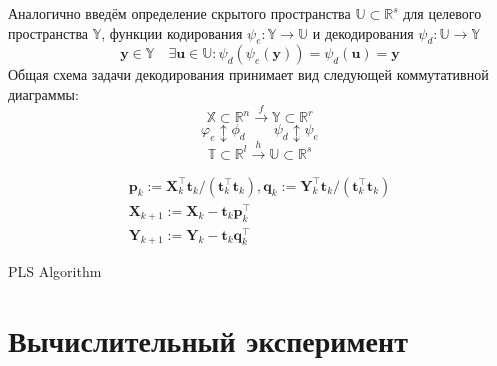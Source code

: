 \documentclass{article}
\begin{document}
Аналогично введём определение скрытого пространства $\mathbb{U} \subset \mathbb{R}^{s}$ для целевого пространства $\mathbb{Y}$, функции кодирования $\psi_{e}: \mathbb{Y} \rightarrow \mathbb{U}$ и декодирования
$\psi_{d}: \mathbb{U} \rightarrow \mathbb{Y}$
$$
\mathbf{y} \in \mathbb{Y} \quad \exists \mathbf{u} \in \mathbb{U}: \psi_{d}\left(\psi_{e}(\mathbf{y})\right)=\psi_{d}(\mathbf{u})=\mathbf{y}
$$
Общая схема задачи декодирования принимает вид следующей коммутативной
диаграммы:
$$\mathbb{X} \subset \mathbb{R}^{n} \stackrel{f}{\longrightarrow} \mathbb{Y} \subset \mathbb{R}^{r} $$
$$\varphi_{e} \updownarrow {\phi_{d}} \qquad \psi_{d} \updownarrow \psi_{e} $$
$$\mathbb{T} \subset \mathbb{R}^{l} \stackrel{h}{\longrightarrow}   \mathbb{U} \subset \mathbb{R}^{s}$$




    
\begin{algorithm}[H]
\SetAlgoLined
{}
 \begin{gather*}
    \mathbf{p}_{k}:=\mathbf{X}_{k}^{\top} \mathbf{t}_{k} /\left(\mathbf{t}_{k}^{\top} \mathbf{t}_{k}\right), \mathbf{q}_{k}:=\mathbf{Y}_{k}^{\top} \mathbf{t}_{k} /\left(\mathbf{t}_{k}^{\top} \mathbf{t}_{k}\right) \\
    \mathbf{X}_{k+1}:=\mathbf{X}_{k}-\mathbf{t}_{k} \mathbf{p}_{k}^{\top} \\
    \mathbf{Y}_{k+1}:=\mathbf{Y}_{k}-\mathbf{t}_{k} \mathbf{q}_{k}^{\top}
    \end{gather*}
 \caption{PLS Algorithm}
\end{algorithm}

\section{Вычислительный эксперимент}
\end{document}
